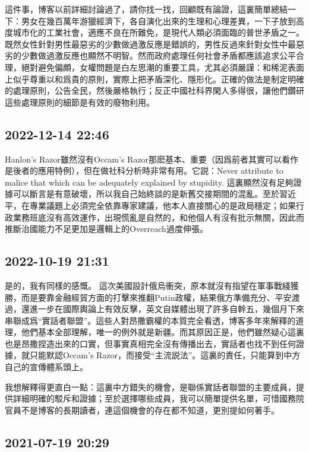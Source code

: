 \documentclass[twocolumn]{ctexart}
\begin{document}
這件事，博客以前詳細討論過了，請你找一找，回顧既有論證，這裏簡單總結一下：男女在幾百萬年游獵經濟下，各自演化出來的生理和心理差異，一下子放到高度城市化的工業社會，適應不良在所難免，是現代人類必須面臨的普世矛盾之一。既然女性針對男性最惡劣的少數做過激反應是錯誤的，男性反過來針對女性中最惡劣的少數做過激反應也顯然不明智。然而政府處理任何社會矛盾都應該追求公平合理，絕對避免偏頗，女權問題是白左思潮的重要工具，尤其必須嚴謹：和稀泥表面上似乎尊重以和爲貴的原則，實際上把矛盾深化、隱形化。正確的做法是制定明確的處理原則，公告全民，然後嚴格執行；反正中國社科界閑人多得很，讓他們鑽研這些處理原則的細節是有效的廢物利用。
\subsection*{2022-12-14 22:46}

Hanlon's Razor雖然沒有Occam's Razor那麽基本、重要（因爲前者其實可以看作是後者的應用特例），但在做社科分析時非常有用。它説：Never attribute to malice that which can be adequately explained by stupidity.
這裏顯然沒有足夠證據可以斷言是有意破壞，所以我自己始終談的是新舊交接期間的混亂。至於習近平，在專業議題上必須完全依靠專家建議，他本人直接關心的是政局穩定；如果行政業務班底沒有高效運作，出現慌亂是自然的，和他個人有沒有批示無關，因此而推斷治國能力不足更加是邏輯上的Overreach過度伸張。
\subsection*{2022-10-19 21:31}

是的，我有同樣的感慨。
這次美國設計俄烏衝突，原本就沒有指望在軍事戰綫獲勝，而是要靠金融經貿方面的打擊來推翻Putin政權，結果俄方準備充分、平安渡過，還進一步在國際輿論上有效反擊，英文自媒體出現了許多自幹五，幾個月下來串聯成爲“實話者聯盟”。這些人對昂撒霸權的本質完全看透，博客多年來解釋的道理，他們基本全部理解，唯一的例外就是新疆。而其原因正是，他們雖然疑心這裏也是昂撒捏造出來的口實，但事實真相完全沒有傳播出去，實話者也找不到任何證據，就只能默認Occam's Razor，而接受“主流説法”。這裏的責任，只能算到中方自己的宣傳體系頭上。

我想解釋得更直白一點：這裏中方錯失的機會，是聯係實話者聯盟的主要成員，提供詳細明確的駁斥和證據；至於選擇哪些成員，我可以簡單提供名單，可惜國務院官員不是博客的長期讀者，連這個機會的存在都不知道，更別提如何著手。
\subsection*{2021-07-19 20:29}
\end{document}
